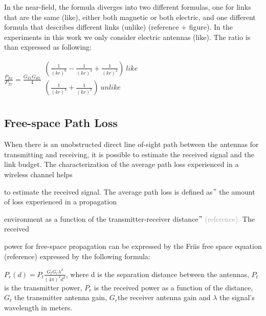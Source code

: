 In the near-field, the formula diverges into two different formulas, one for links that are the same (like), either both magnetic or both electric, and one different formula that describes different links (unlike) (reference + figure). In the experiments in this work we only consider electric antennas (like). The ratio is than expressed as following:


 $\frac{P_{Rx}}{P_{Tx}}=\frac{G_{Tx}G_{Rx}}{4} \begin{array}{c}
	 \left( \frac{1}{ \left( kr \right) ^{6}}-\frac{1}{ \left( kr \right) ^{4}}+\frac{1}{ \left( kr \right) ^{2}} \right) ~like~\\
	 \left( \frac{1}{ \left( kr \right) ^{4}}+\frac{1}{ \left( kr \right) ^{2}} \right) ~unlike\\
	\end{array}  $


%




\subsection{Free-space Path Loss}

When there is an unobstructed direct line of-sight path between the antennas for transmitting and receiving, it is possible to estimate the received signal and the link budget. The characterization of the average path loss experienced in a wireless channel helps

to estimate the received signal. The average path loss is defined as$"$  the amount of loss experienced in a propagation

environment as a function of the transmitter-receiver distance$"$  \textcolor[HTML]{A6A6A6}{(reference). }The received

power for free-space propagation can be expressed by the Friis free space equation (reference) expressed by the following formula:

$P_{r} \left( d \right) = P_{t}\frac{G_{t}G_{r} \lambda ^{2}}{ \left( 4 \pi  \right) ^{2}d^{2}} $, where d is the separation distance between the antennas,  $P_{t}$ is the transmitter power, $P_{r}$ is the received power as a function of the distance,  $G_{t}$ the transmitter antenna gain,  $G_{r}$the receiver antenna gain and  $\lambda$ the signal's wavelength in meters.


